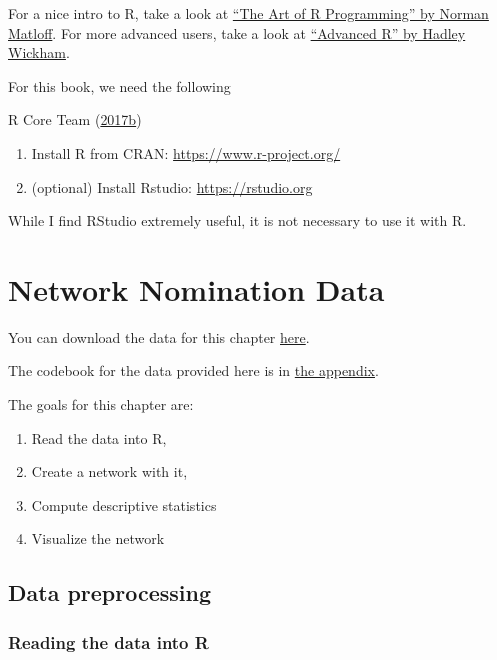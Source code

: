 \documentclass[
]{book}
\begin{document}
For a nice intro to R, take a look at \href{https://nostarch.com/artofr.htm}{``The Art of R Programming'' by Norman Matloff}. For more advanced users, take a look at \href{http://adv-r.had.co.nz/}{``Advanced R'' by Hadley Wickham}.

For this book, we need the following

R Core Team (\protect\hyperlink{ref-R}{2017b})

\begin{enumerate}
\def\labelenumi{\arabic{enumi}.}
\item
  Install R from CRAN: \url{https://www.r-project.org/}
\item
  (optional) Install Rstudio: \url{https://rstudio.org}
\end{enumerate}

While I find RStudio extremely useful, it is not necessary to use it with R.

\hypertarget{network-nomination-data}{%
\chapter{Network Nomination Data}\label{network-nomination-data}}

You can download the data for this chapter \href{https://cdn.rawgit.com/gvegayon/appliedsnar/fdc0d26f/03-sns.dta}{here}.

The codebook for the data provided here is in \protect\hyperlink{sns-data}{the appendix}.

The goals for this chapter are:

\begin{enumerate}
\def\labelenumi{\arabic{enumi}.}
\item
  Read the data into R,
\item
  Create a network with it,
\item
  Compute descriptive statistics
\item
  Visualize the network
\end{enumerate}

\hypertarget{data-preprocessing}{%
\section{Data preprocessing}\label{data-preprocessing}}

\hypertarget{reading-the-data-into-r}{%
\subsection{Reading the data into R}\label{reading-the-data-into-r}}
\end{document}
